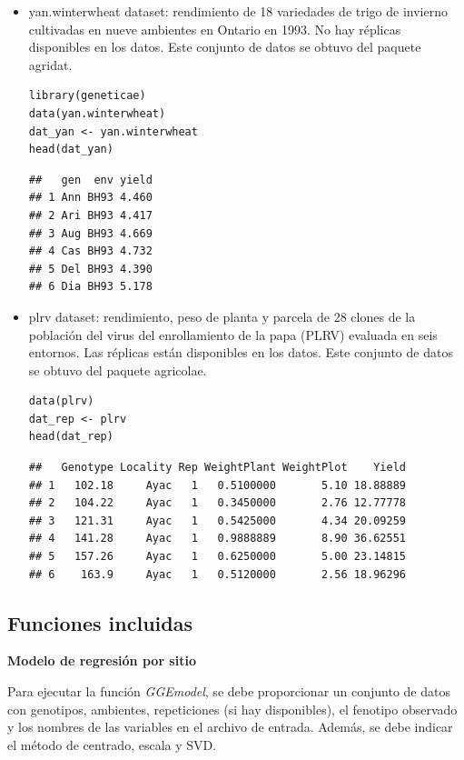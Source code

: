 \begin{itemize}
\item yan.winterwheat dataset: rendimiento de 18 variedades de trigo de invierno cultivadas en nueve ambientes en Ontario en 1993. No hay réplicas disponibles en los datos. Este conjunto de datos se obtuvo del paquete agridat.

\begin{lstlisting}
library(geneticae)
data(yan.winterwheat)
dat_yan <- yan.winterwheat
head(dat_yan)
\end{lstlisting}

\begin{verbatim}
##   gen  env yield
## 1 Ann BH93 4.460
## 2 Ari BH93 4.417
## 3 Aug BH93 4.669
## 4 Cas BH93 4.732
## 5 Del BH93 4.390
## 6 Dia BH93 5.178
\end{verbatim}

\item plrv dataset: rendimiento, peso de planta y parcela de 28 clones de la población del virus del enrollamiento de la papa (PLRV) evaluada en seis entornos. Las réplicas están disponibles en los datos. Este conjunto de datos se obtuvo del paquete agricolae.

\begin{lstlisting}
data(plrv)
dat_rep <- plrv
head(dat_rep)
\end{lstlisting}


\begin{verbatim}
##   Genotype Locality Rep WeightPlant WeightPlot    Yield
## 1   102.18     Ayac   1   0.5100000       5.10 18.88889
## 2   104.22     Ayac   1   0.3450000       2.76 12.77778
## 3   121.31     Ayac   1   0.5425000       4.34 20.09259
## 4   141.28     Ayac   1   0.9888889       8.90 36.62551
## 5   157.26     Ayac   1   0.6250000       5.00 23.14815
## 6    163.9     Ayac   1   0.5120000       2.56 18.96296
\end{verbatim}
\end{itemize}
 
\subsection{Funciones incluidas}

\textbf{Modelo de regresión por sitio}

Para ejecutar la función \emph{GGEmodel}, se debe proporcionar un conjunto de datos con genotipos, ambientes, repeticiones (si hay disponibles), el fenotipo observado y los nombres de las variables en el archivo de entrada. Además, se debe indicar el método de centrado, escala y SVD.

